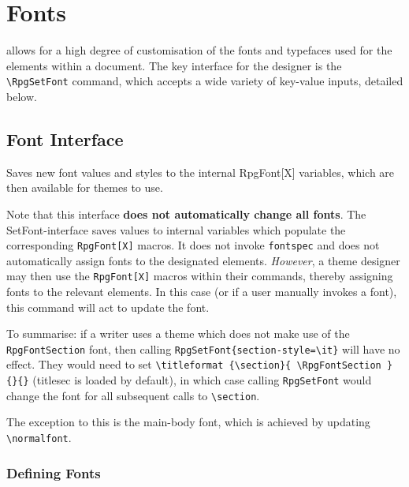 \chapter{Fonts}

	\rpgtex{} allows for a high degree of customisation of the fonts and typefaces used for the elements within a document. The key interface for the designer is the \verb|\RpgSetFont| command, which accepts a wide variety of key-value inputs, detailed below. 

	
	\section{Font Interface}\label{S:FontInterface}

		\begin{macrolist}
			{
				Saves new font values and styles to the internal RpgFont[X] variables, which are then available for themes to use.			
			}
			{
			}{
				Note that this interface \textbf{does not automatically change all fonts}. The SetFont-interface saves values to internal variables which populate the corresponding \verb|RpgFont[X]| macros. It does not invoke \verb|fontspec| and does not automatically assign fonts to the designated elements. \textit{However}, a theme designer may then use the \verb|RpgFont[X]| macros within their commands, thereby assigning fonts to the relevant elements. In this case (or if a user manually invokes a font), this command will act to update the font.

				To summarise: if a writer uses a theme which does not make use of the \verb|RpgFontSection| font, then calling \verb|RpgSetFont{section-style=\it}| will have no effect. They would need to set \verb|\titleformat {\section}{ \RpgFontSection }{}{}| (titlesec is loaded by default), in which case calling \verb|RpgSetFont| would change the font for all subsequent calls to \verb|\section|.
				
				The exception to this is the main-body font, which is achieved by updating \verb|\normalfont|. 
			}
		\end{macrolist}

		\subsection{Defining Fonts}

